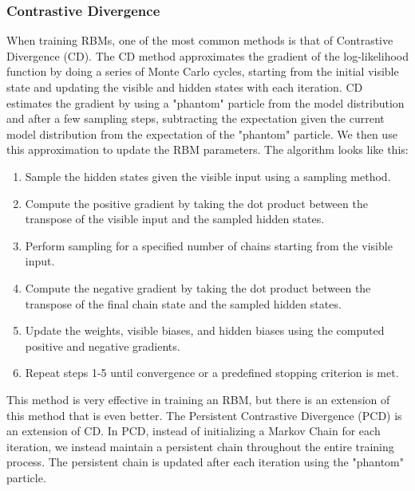 \documentclass{article}
\begin{document}
\subsubsection{Contrastive Divergence}
When training RBMs, one of the most common methods is that of Contrastive Divergence (CD). The CD method approximates the gradient of the log-likelihood function by doing a series of Monte Carlo cycles, starting from the initial visible state and updating the visible and hidden states with each iteration. CD estimates the gradient by using a "phantom" particle from the model distribution and after a few sampling steps, subtracting the expectation given the current model distribution from the expectation of the "phantom" particle. We then use this approximation to update the RBM parameters.
\newline
The algorithm looks like this:
\begin{enumerate}
\item Sample the hidden states given the visible input using a sampling method.
\item Compute the positive gradient by taking the dot product between the transpose of the visible input and the sampled hidden states.
\item Perform sampling for a specified number of chains starting from the visible input.
\item Compute the negative gradient by taking the dot product between the transpose of the final chain state and the sampled hidden states.
\item Update the weights, visible biases, and hidden biases using the computed positive and negative gradients.
\item Repeat steps 1-5 until convergence or a predefined stopping criterion is met.
\end{enumerate}
This method is very effective in training an RBM, but there is an extension of this method that is even better.
\newline
The Persistent Contrastive Divergence (PCD) is an extension of CD. In PCD, instead of initializing a Markov Chain for each iteration, we instead maintain a persistent chain throughout the entire training process. The persistent chain is updated after each iteration using the "phantom" particle.
\end{document}
